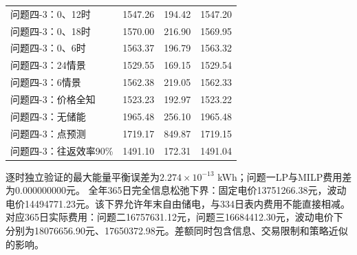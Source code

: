 {\begin{longtable}{lrrr}
问题四-3：0、12时 & 1547.26 & 194.42 & 1547.20\\
问题四-3：0、18时 & 1570.00 & 216.90 & 1569.95\\
问题四-3：0、6时 & 1563.37 & 196.79 & 1563.32\\
问题四-3：24情景 & 1529.55 & 169.15 & 1529.54\\
问题四-3：6情景 & 1562.38 & 219.05 & 1562.33\\
问题四-3：价格全知 & 1523.23 & 192.97 & 1523.22\\
问题四-3：无储能 & 1965.48 & 256.10 & 1965.48\\
问题四-3：点预测 & 1719.17 & 849.87 & 1719.15\\
问题四-3：往返效率90\% & 1491.10 & 172.31 & 1491.04\\
\bottomrule\end{longtable}}
逐时独立验证的最大能量平衡误差为$2.274\times 10^{-13}$ kWh；问题一LP与MILP费用差为0.000000000元。
全年365日完全信息松弛下界：固定电价13751266.38元，波动电价14494771.23元。该下界允许年末自由储电，与334日表内费用不能直接相减。
对应365日实际费用：问题二16757631.12元，问题三16684412.30元，波动电价下分别为18076656.90元、17650372.98元。差额同时包含信息、交易限制和策略近似的影响。
\FloatBarrier
